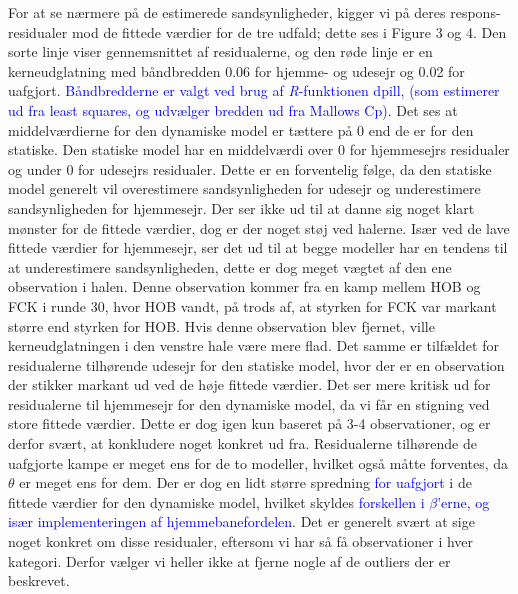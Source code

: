 \documentclass[11pt,a4paper]{article}
\begin{document}
 For at se nærmere på de estimerede sandsynligheder, kigger vi på deres respons-residualer mod de fittede værdier for de tre udfald; dette ses i Figure 3 og 4. Den sorte linje viser gennemsnittet af residualerne, og den røde linje er en kerneudglatning med båndbredden 0.06 for hjemme- og udesejr og 0.02 for uafgjort. \textcolor{blue}{Båndbredderne er valgt ved brug af \textit{R}-funktionen {\selectfont dpill}, (som estimerer ud fra least squares, og udvælger bredden ud fra Mallows Cp)}. Det ses at middelværdierne for den dynamiske model er tættere på 0 end de er for den statiske. Den statiske model har en middelværdi over 0 for hjemmesejrs residualer og under 0 for udesejrs residualer. Dette er en forventelig følge, da den statiske model generelt vil overestimere sandsynligheden for udesejr og underestimere sandsynligheden for hjemmesejr. Der ser ikke ud til at danne sig noget klart mønster for de fittede værdier, dog er der noget støj ved halerne. Især ved de lave fittede værdier for hjemmesejr, ser det ud til at begge modeller har en tendens til at underestimere sandsynligheden, dette er dog meget vægtet af den ene observation i halen. Denne observation kommer fra en kamp mellem HOB og FCK i runde 30, hvor HOB vandt, på trods af, at styrken for FCK var markant større end styrken for HOB. Hvis denne observation blev fjernet, ville kerneudglatningen i den venstre hale være mere flad. Det samme er tilfældet for residualerne tilhørende udesejr for den statiske model, hvor der er en observation der stikker markant ud ved de høje fittede værdier. Det ser mere kritisk ud for residualerne til hjemmesejr for den dynamiske model, da vi får en stigning ved store fittede værdier. Dette er dog igen kun baseret på 3-4 observationer, og er derfor svært, at konkludere noget konkret ud fra. Residualerne tilhørende de uafgjorte kampe er meget ens for de to modeller, hvilket også måtte forventes, da $\theta$ er meget ens for dem. Der er dog en lidt større spredning \textcolor{blue}{for uafgjort} i de fittede værdier for den dynamiske model, hvilket skyldes \textcolor{blue}{forskellen i $\beta$'erne, og især implementeringen af hjemmebanefordelen}. Det er generelt svært at sige noget konkret om disse residualer, eftersom vi har så få observationer i hver kategori. Derfor vælger vi heller ikke at fjerne nogle af de outliers der er beskrevet.
\end{document}
